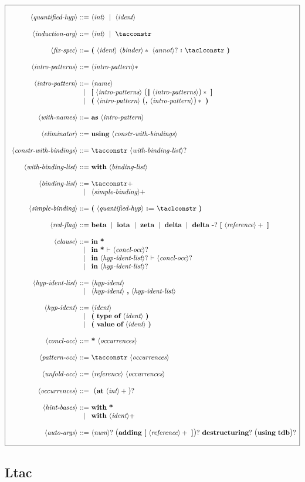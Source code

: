 \documentclass{article}
\makeatletter
\def\bfbar{\ensuremath{|\hskip -0.22em{}|\hskip -0.24em{}|}}
\def\TERMbar{\bfbar}
\def\GR#1{\text{\large(}#1\text{\large)}}
\def\NT#1{\langle\textit{#1}\rangle}
\def\TERM#1{{\bf\textrm{\bf #1}}}
\def\KWD#1{\TERM{#1}}
\def\STAR#1{#1*}
\def\STARGR#1{\GR{#1}*}
\def\PLUS#1{#1+}
\def\OPT#1{#1?}
\def\OPTGR#1{\GR{#1}?}
\newenvironment{cadre}
        {\begin{array}{|c|}\hline\\}
        {\\\\\hline\end{array}}
\newenvironment{rulebox}
        {$$\begin{cadre}\begin{array}{r@{~}c@{~}l@{}l@{}r}}
        {\end{array}\end{cadre}$$}
\def\DEFNT#1{\NT{#1} & ::= &}
\def\SEPDEF{\\\\}
\def\nlsep{\\&|&}
\newenvironment{rules}
        {\begin{center}\begin{rulebox}}
        {\end{rulebox}\end{center}}
\makeatother
\begin{document}
\begin{rules}
\DEFNT{quantified-hyp}
       \NT{int}~\mid~\NT{ident}
\SEPDEF
\DEFNT{induction-arg}
       \NT{int}~\mid~\tacconstr
\SEPDEF
\DEFNT{fix-spec}
       \KWD{(}~\NT{ident}~\STAR{\NT{binder}}~\OPT{\NT{annot}}
       ~\KWD{:}~\taclconstr~\KWD{)}
\SEPDEF
\DEFNT{intro-patterns}
       \STAR{\NT{intro-pattern}}
\SEPDEF
\DEFNT{intro-pattern}
       \NT{name}
\nlsep \TERM{[}~\NT{intro-patterns}~\STARGR{\TERMbar~\NT{intro-patterns}}
       ~\TERM{]}
\nlsep \KWD{(}~\NT{intro-pattern}~\STARGR{\KWD{,}~\NT{intro-pattern}}
       ~\KWD{)}
\SEPDEF
\DEFNT{with-names}
       \KWD{as}~\NT{intro-pattern}
\SEPDEF
\DEFNT{eliminator}
       \TERM{using}~\NT{constr-with-bindings}
\SEPDEF
\DEFNT{constr-with-bindings}
       \tacconstr~\OPT{\NT{with-binding-list}}
\SEPDEF
\DEFNT{with-binding-list}
       \KWD{with}~\NT{binding-list}
\SEPDEF
\DEFNT{binding-list}
       \PLUS{\tacconstr}
\nlsep \PLUS{\NT{simple-binding}}
\SEPDEF
\DEFNT{simple-binding}
       \KWD{(}~\NT{quantified-hyp}~\KWD{:=}~\taclconstr~\KWD{)}
\SEPDEF
\DEFNT{red-flag}
       \TERM{beta} ~\mid~ \TERM{iota} ~\mid~ \TERM{zeta}
       ~\mid~ \TERM{delta} ~\mid~
       \TERM{delta}~\OPT{\TERM{-}}~\TERM{[}~\PLUS{\NT{reference}}~\TERM{]}
\SEPDEF
\DEFNT{clause}
       \KWD{in}~\TERM{*}
\nlsep \KWD{in}~\TERM{*}~\KWD{$\vdash$}~\OPT{\NT{concl-occ}}
\nlsep \KWD{in}~\OPT{\NT{hyp-ident-list}} ~\KWD{$\vdash$} ~\OPT{\NT{concl-occ}}
\nlsep \KWD{in}~\OPT{\NT{hyp-ident-list}}
\SEPDEF
\DEFNT{hyp-ident-list}
       \NT{hyp-ident}
\nlsep \NT{hyp-ident}~\KWD{,}~\NT{hyp-ident-list}
\SEPDEF
\DEFNT{hyp-ident}
       \NT{ident}
\nlsep \KWD{(}~\TERM{type}~\TERM{of}~\NT{ident}~\KWD{)}
\nlsep \KWD{(}~\TERM{value}~\TERM{of}~\NT{ident}~\KWD{)}
\SEPDEF
\DEFNT{concl-occ}
       \TERM{*} ~\NT{occurrences}
\SEPDEF
\DEFNT{pattern-occ}
       \tacconstr ~\NT{occurrences}
\SEPDEF
\DEFNT{unfold-occ}
       \NT{reference}~\NT{occurrences}
\SEPDEF
\DEFNT{occurrences}
       ~\OPTGR{\KWD{at}~\PLUS{\NT{int}}}
\SEPDEF
\DEFNT{hint-bases}
       \KWD{with}~\TERM{*}
\nlsep \KWD{with}~\PLUS{\NT{ident}}
\SEPDEF
\DEFNT{auto-args}
       \OPT{\NT{num}}~\OPTGR{\TERM{adding}~\TERM{[}~\PLUS{\NT{reference}}
       ~\TERM{]}}~\OPT{\TERM{destructuring}}~\OPTGR{\TERM{using}~\TERM{tdb}}
\end{rules}

\subsection{Ltac}
\end{document}
